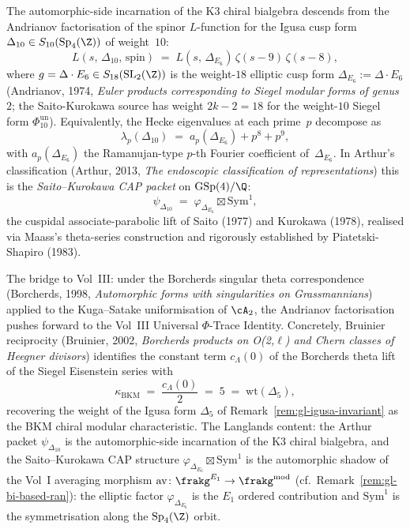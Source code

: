 \begin{remark}
\label{rem:gl-andrianov-arthur}
The automorphic-side incarnation of the K3 chiral bialgebra descends from the Andrianov factorisation of the spinor $L$-function for the Igusa cusp form $\Delta_{10} \in S_{10}(\mathrm{Sp}_4(\Z))$ of weight~$10$:
\[
 L(s,\, \Delta_{10},\, \mathrm{spin}) \;=\; L(s,\, \Delta_{E_6})\, \zeta(s - 9)\, \zeta(s - 8),
\]
where $g = \Delta \cdot E_6 \in S_{18}(\mathrm{SL}_2(\Z))$ is the weight-$18$ elliptic cusp form $\Delta_{E_6} := \Delta \cdot E_6$ (Andrianov, 1974, \emph{Euler products corresponding to Siegel modular forms of genus~$2$}; the Saito-Kurokawa source has weight $2k - 2 = 18$ for the weight-$10$ Siegel form $\Phi_{10}^{\mathrm{un}}$). Equivalently, the Hecke eigenvalues at each prime~$p$ decompose as
\[
 \lambda_p(\Delta_{10}) \;=\; a_p(\Delta_{E_6}) + p^8 + p^9,
\]
with $a_p(\Delta_{E_6})$ the Ramanujan-type $p$-th Fourier coefficient of~$\Delta_{E_6}$. In Arthur's classification (Arthur, 2013, \emph{The endoscopic classification of representations}) this is the \emph{Saito--Kurokawa CAP packet} on $\mathrm{GSp}(4)/\Q$:
\[
 \psi_{\Delta_{10}} \;=\; \varphi_{\Delta_{E_6}} \boxtimes \mathrm{Sym}^1,
\]
the cuspidal associate-parabolic lift of Saito (1977) and Kurokawa (1978), realised via Maass's theta-series construction and rigorously established by Piatetski-Shapiro (1983).

The bridge to Vol~III: under the Borcherds singular theta correspondence (Borcherds, 1998, \emph{Automorphic forms with singularities on Grassmannians}) applied to the Kuga--Satake uniformisation of $\cA_2$, the Andrianov factorisation pushes forward to the Vol~III Universal $\Phi$-Trace Identity. Concretely, Bruinier reciprocity (Bruinier, 2002, \emph{Borcherds products on O(2,$\ell$) and Chern classes of Heegner divisors}) identifies the constant term $c_\Lambda(0)$ of the Borcherds theta lift of the Siegel Eisenstein series with
\[
 \kappa_{\mathrm{BKM}} \;=\; \frac{c_\Lambda(0)}{2} \;=\; 5 \;=\; \mathrm{wt}(\Delta_5),
\]
recovering the weight of the Igusa form $\Delta_5$ of Remark~\ref{rem:gl-igusa-invariant} as the BKM chiral modular characteristic. The Langlands content: the Arthur packet $\psi_{\Delta_{10}}$ is the automorphic-side incarnation of the K3 chiral bialgebra, and the Saito--Kurokawa CAP structure $\varphi_{\Delta_{E_6}} \boxtimes \mathrm{Sym}^1$ is the automorphic shadow of the Vol~I averaging morphism $\mathrm{av}\colon \frakg^{E_1} \to \frakg^{\mathrm{mod}}$ (cf.\ Remark~\ref{rem:gl-bi-based-ran}): the elliptic factor $\varphi_{\Delta_{E_6}}$ is the $E_1$ ordered contribution and $\mathrm{Sym}^1$ is the symmetrisation along the $\mathrm{Sp}_4(\Z)$ orbit.
\end{remark}


